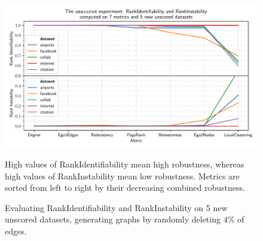 \begin{figure}
    \includegraphics[width=\linewidth]{plot_unscored.pdf}
    \vspace*{-0.6cm}
    \caption{Evaluating RankIdentifiability and RankInstability on 5 new unscored datasets, generating graphs by randomly deleting $4\%$ of edges.}
    \label{fig:plot_unscored}
    \footnotesize
    \begin{flushleft}
        High values of RankIdentifiability mean high robustness, whereas high values of RankInstability mean low robustness.
        Metrics are sorted from left to right by their decreasing combined robustness.
    \end{flushleft}
\end{figure}
